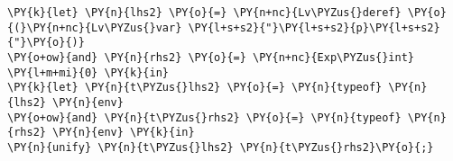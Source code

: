 \begin{Verbatim}[commandchars=\\\{\}]
\PY{k}{let} \PY{n}{lhs2} \PY{o}{=} \PY{n+nc}{Lv\PYZus{}deref} \PY{o}{(}\PY{n+nc}{Lv\PYZus{}var} \PY{l+s+s2}{"}\PY{l+s+s2}{p}\PY{l+s+s2}{"}\PY{o}{)}
\PY{o+ow}{and} \PY{n}{rhs2} \PY{o}{=} \PY{n+nc}{Exp\PYZus{}int} \PY{l+m+mi}{0} \PY{k}{in}
\PY{k}{let} \PY{n}{t\PYZus{}lhs2} \PY{o}{=} \PY{n}{typeof} \PY{n}{lhs2} \PY{n}{env}
\PY{o+ow}{and} \PY{n}{t\PYZus{}rhs2} \PY{o}{=} \PY{n}{typeof} \PY{n}{rhs2} \PY{n}{env} \PY{k}{in}
\PY{n}{unify} \PY{n}{t\PYZus{}lhs2} \PY{n}{t\PYZus{}rhs2}\PY{o}{;}
\end{Verbatim}
